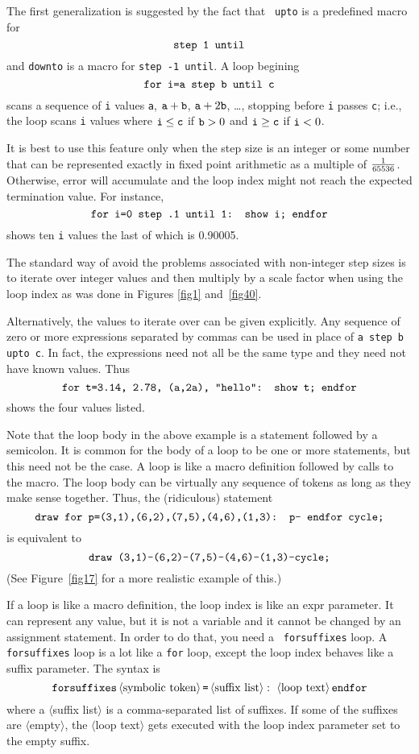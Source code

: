 \documentclass{article} %
\newcommand\descr[1]{{\langle\hbox{#1}\rangle}}
\newcommand\invisgap{\nobreak\hskip0pt\relax}
\newcommand\tdescr[1]{$\langle$\invisgap#1\invisgap$\rangle$}
\begin{document}
The first generalization is suggested by the fact that {\tt
upto} is a predefined macro
for
$$ \hbox{\tt step 1 until} $$
and {\tt downto} is a macro for {\tt step
-1 until}.  A loop begining
$$ \hbox{\tt for i=a step b until c} $$
scans a sequence of {\tt i} values {\tt a}, ${\tt a}+{\tt b}$, ${\tt
a}+2{\tt b}$, \ldots, stopping before {\tt i} passes {\tt c}; i.e., the
loop scans {\tt i} values where ${\tt i}\le {\tt c}$ if ${\tt b}>0$ and
${\tt i}\ge {\tt c}$ if ${\tt i}<0$.

It is best to use this feature only when the step size is an integer or
some number that can be represented exactly in fixed point
arithmetic as a multiple of $1\over65536$.  Otherwise,
error will accumulate and the loop index might not reach the expected
termination value.  For instance,
$$ \hbox{\tt for i=0 step .1 until 1: show i; endfor} $$
shows ten {\tt i} values the last of which is 0.90005.

The standard way of avoid the problems associated with non-integer step
sizes is to iterate over integer values and then multiply by a scale
factor when using the loop index as was done in Figures \ref{fig1}
and~\ref{fig40}.

Alternatively, the values to iterate over can be given explicitly.  Any
sequence of zero or more expressions separated by commas can be used in
place of {\tt a step b upto c}.  In fact, the expressions need not all
be the same type and they need not have known values.  Thus
$$ \hbox{\tt for t=3.14, 2.78, (a,2a), "hello": show t; endfor} $$
shows the four values listed.

Note that the loop body in the above example is a statement followed by a
semicolon.  It is common for the body of a loop to be one or more statements,
but this need not be the case.  A loop is like a macro definition followed by
calls to the macro.  The loop body can be virtually any sequence of tokens as
long as they make sense together.  Thus, the (ridiculous) statement
$$ \hbox{\tt draw for p=(3,1),(6,2),(7,5),(4,6),(1,3): p-- endfor cycle;} $$
is equivalent to
$$ \hbox{\tt draw (3,1)--(6,2)--(7,5)--(4,6)--(1,3)--cycle;} $$
(See Figure~\ref{fig17} for a more realistic example of this.)

If a loop is like a macro definition, the loop index is like an expr
parameter.  It can represent any value, but it is
not a variable and it cannot be changed by an assignment
statement.  In order to do that, you need a {\tt
forsuffixes} loop.  A {\tt
forsuffixes} loop is a lot like a {\tt for} loop, except the loop index
behaves like a suffix parameter.  The syntax is
$$ {\tt forsuffixes}\, \descr{symbolic token}\, \hbox{\tt =}\,
   \descr{suffix list}:\ \descr{loop text}\, {\tt endfor}
$$
where a \tdescr{suffix list} is a comma-separated list of suffixes.  If
some of the suffixes are \tdescr{empty}, the \tdescr{loop text} gets
executed with the loop index parameter set to the empty suffix.
\end{document}
